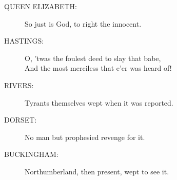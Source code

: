 \documentclass{article}
\begin{document}
\begin{description}
\item[QUEEN ELIZABETH:] 
\hspace{1pt}So just is God, to right the innocent.\\
\end{description}
\begin{description}
\item[HASTINGS:] 
\hspace{1pt}O, 'twas the foulest deed to slay that babe,\\
\hspace{1pt}And the most merciless that e'er was heard of!\\
\end{description}
\begin{description}
\item[RIVERS:] 
\hspace{1pt}Tyrants themselves wept when it was reported.\\
\end{description}
\begin{description}
\item[DORSET:] 
\hspace{1pt}No man but prophesied revenge for it.\\
\end{description}
\begin{description}
\item[BUCKINGHAM:] 
\hspace{1pt}Northumberland, then present, wept to see it.\\
\end{description}
\end{document}
